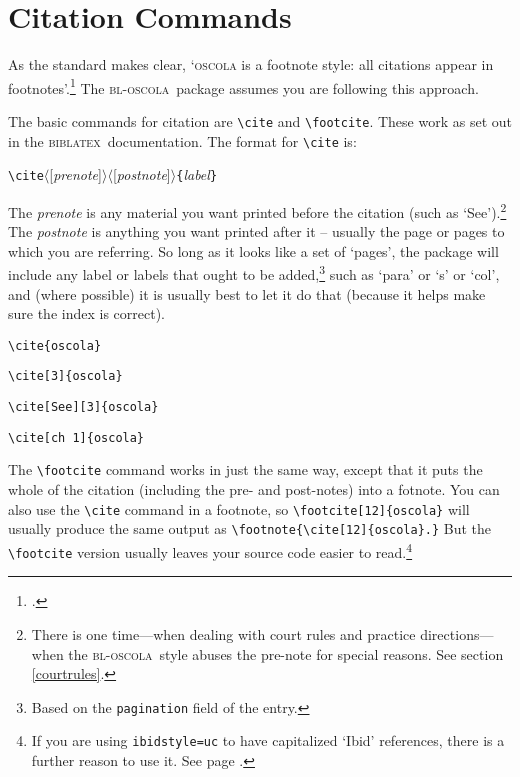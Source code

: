 \documentclass[a5paper,fontsize=9pt,DIV=1]{scrartcl}
\newcommand{\oscola}{\textsc{bl-oscola}}
\newcommand{\biblatex}{\textsc{biblatex}}
\newcommand{\egcite}[1]{\texttt{\textbackslash cite#1}}
\begin{document}
\section{Citation Commands}

As the standard makes clear, `\textsc{oscola} is a footnote style: all
citations appear in footnotes'.\footcite[3]{oscola} The \oscola\
package assumes you are following this approach.

The basic commands for citation are \verb|\cite| and
\verb|\footcite|. These work as set out in the \biblatex\
documentation.
\index[general]{cite@\texttt{\textbackslash cite}}
The format for \verb|\cite| is:
\begin{center}
\verb|\cite|$\langle$[\emph{prenote}]$\rangle \langle$[\emph{postnote}]$\rangle$\verb|{|\emph{label}\verb|}|
\end{center}
The \emph{prenote} is any material you want printed before the
citation (such as `See').\footnote{There is one time---when dealing
  with court rules and practice directions---when the \oscola\ style
  abuses the pre-note for special reasons. See section
  \ref{courtrules}.}
The \emph{postnote} is anything you want
printed after it -- usually the page or pages to which you are
referring. So long as it looks like a set of `pages', the package will
include any label or labels that ought to be added,\footnote{Based on the \texttt{pagination} field of the entry.} such as `para' or
`s' or `col', and (where possible) it is usually best to let it do
that (because it helps make sure the index is correct).

\begin{description}
\item[\egcite{\{oscola\}}]          \cite{oscola}
\item[\egcite{[3]\{oscola\}}]       \cite[3]{oscola} 
\item[\egcite{[See][3]\{oscola\}}]  \cite[See][3]{oscola}
\item[\egcite{[ch~1]\{oscola\}}]    \cite[ch~1]{oscola}
\end{description}

The \verb|\footcite| command works in just the same way, except that
it puts the whole of the citation (including the pre- and post-notes)
into a fotnote.
\index[general]{footcite@\texttt{\textbackslash footcite}}
You can also use the \verb|\cite| command in a
footnote, so \verb|\footcite[12]{oscola}| will usually produce the same output as
\verb|\footnote{\cite[12]{oscola}.}| But the \verb|\footcite| version usually leaves your source code easier to read.\footnote{If you are using \texttt{ibidstyle=uc} to have capitalized `Ibid' references, there is a further reason to use it. See page \pageref{ibidstyle}.}
\end{document}
